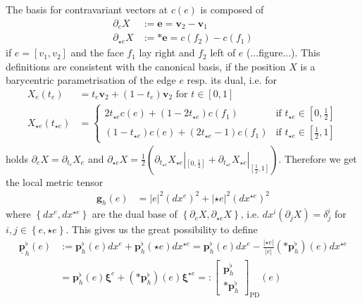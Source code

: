 \documentclass[a4paper,11pt]{scrartcl}
\newcommand{\pflh}{\mathbf{p}^{\flat}_{h}}
\newcommand{\PDpflh}{\underline{\mathbf{p}}^{\flat}_{h}}
\newcommand{\e}{\mathbf{e}}
\renewcommand{\v}{\mathbf{v}}
\newcommand{\PDxi}{\boldsymbol{\xi}}
\begin{document}
    The basis for contravariant vectors at \( c(e) \) is composed of
    \begin{align}
      \partial_{e}X &:= \e = \v_{2} - \v_{1} \\
      \partial_{\star e}X &:= *\e =  c(f_{2}) - c(f_{1})
    \end{align}
    if \( e=\left[ v_{1}, v_{2} \right] \) and the face \( f_{1} \) lay right and \( f_{2} \) left of \( e \) (...figure...). 
    This definitions are consistent with the canonical basis, if the position \( X \) is a barycentric parametrisation of the edge \( e \)
    resp. its dual, i.e. for
    \begin{align}
      X_{e}(t_{e}) &= t_{e}\v_{2} + \left( 1 - t_{e} \right)\v_{2} \text{ for } t\in[0,1]\\
      X_{\star e}(t_{\star e}) &=\begin{cases}
                        2t_{\star e}c(e) + \left( 1 - 2t_{\star e} \right) c(f_{1}) & \text{if } t_{\star e}\in\left[ 0 , \frac{1}{2} \right] \\
                        \left(1 - t_{\star e}\right) c(e) + \left( 2t_{\star e} - 1 \right) c(f_{1}) 
                                & \text{if } t_{\star e}\in \left[\frac{1}{2} , 1\right]
                      \end{cases}
    \end{align}
    holds \( \partial_{e}X = \partial_{t_{e}}X_{e} \) 
    and \( \partial_{\star e}X = \frac{1}{2} \left( \partial_{t_{\star e}}X_{\star e}|_{\left[ 0 , \frac{1}{2} \right]} 
                                                   + \partial_{t_{\star e}}X_{\star e}|_{\left[\frac{1}{2}, 1 \right]}\right) \).
    Therefore we get the local metric tensor
    \begin{align}
      \mathbf{g}_h(e) &= \left| e \right|^{2} \left( dx^{e} \right)^{2} + \left| \star e \right|^{2} \left( dx^{\star e} \right)^{2}
    \end{align}
    where \( \left\{  dx^{e}, dx^{\star e} \right\} \) are the dual base of \( \left\{ \partial_{e}X, \partial_{\star e}X \right\} \),
    i.e. \( dx^{i}\left(\partial_{j}X\right) = \delta^{i}_{j} \) for \( i,j\in\left\{ e, \star e \right\} \).
    This gives us the great possibility to define
    \begin{align}
      \PDpflh(e) &:= \pflh(e)dx^{e} + \pflh(\star e)  dx^{\star e} 
                   = \pflh(e)dx^{e} - \frac{\left| \star e \right|}{\left| e \right|} \left(*\pflh\right)(e)  dx^{\star e} \\
                 &=  \pflh(e)\PDxi^{e} + \left(*\pflh\right)(e)\PDxi^{\star e}
                 =:
                   \begin{bmatrix}
                     \pflh \\ *\pflh 
                   \end{bmatrix}_{\text{PD}} (e)
    \end{align}
\end{document}
